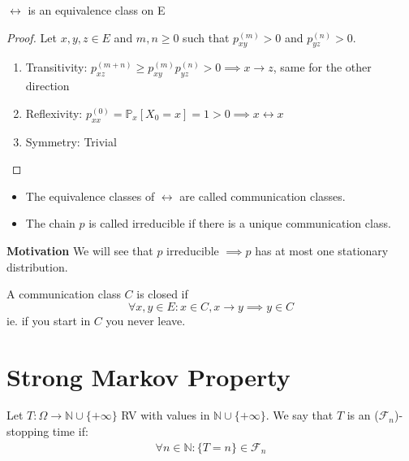 \begin{prop}[]
	$\leftrightarrow$ is an equivalence class on E
\end{prop}
\begin{proof}
	Let $x,y,z \in E$ and $m,n \geq 0$ such that $p_{xy}^{(m)}>0$ and $p_{yz}^{(n)}>0$.
\begin{enumerate}
	\item Transitivity: $p_{xz}^{(m+n)} \geq p_{xy}^{(m)}p_{yz}^{(n)} >0 \implies x\rightarrow z$, same for the other direction 
	\item Reflexivity: $p_{xx}^{(0)} = \mathbb{P}_{x} \left[ X_0 = x \right] =1>0 \implies x \leftrightarrow x$ 
	\item Symmetry: Trivial
\end{enumerate}
\end{proof}


\begin{defn} \hfill
\begin{itemize}
\item The equivalence classes of $\leftrightarrow$ are called communication classes.
\item The chain $p$ is called irreducible if there is a unique communication class.
\end{itemize}
\end{defn}

\noindent
\textbf{Motivation} We will see that $p$ irreducible $\implies p$ has at most one stationary distribution.

\begin{defn}
	A communication class $C$ is closed if 
\begin{equation}
\forall x,y \in E: x \in C, x \to y \implies y \in C
\end{equation}
ie. if you start in $C$ you never leave.
\end{defn}

\section{Strong Markov Property}
	
\begin{defn}
	Let $T:\Omega \to \mathbb{N} \cup \{+\infty\}$ RV with values in $\mathbb{N}\cup\{+\infty\}$. We say that $T$ is an ($ \mathcal{F}_n$)-stopping time if:
	\begin{align}
		\forall n \in \mathbb{N}: \{T=n\} \in \mathcal{F}_n
	\end{align}
	
\end{defn}

